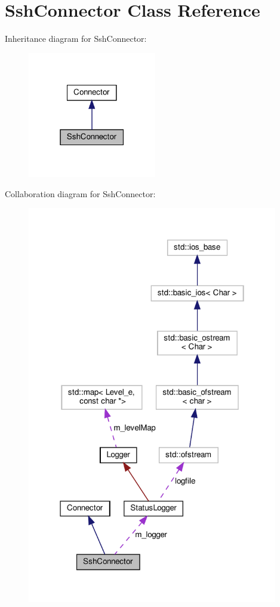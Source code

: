 \hypertarget{classSshConnector}{}\section{Ssh\+Connector Class Reference}
\label{classSshConnector}


Inheritance diagram for Ssh\+Connector\+:\nopagebreak
\begin{figure}[H]
\begin{center}
\leavevmode
\includegraphics[width=159pt]{classSshConnector__inherit__graph}
\end{center}
\end{figure}


Collaboration diagram for Ssh\+Connector\+:\nopagebreak
\begin{figure}[H]
\begin{center}
\leavevmode
\includegraphics[width=310pt]{classSshConnector__coll__graph}
\end{center}
\end{figure}
